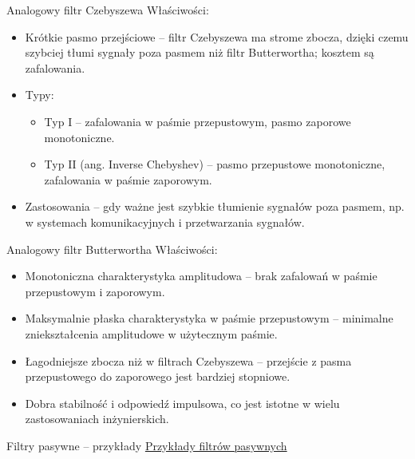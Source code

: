 \begin{frame}{Analogowy filtr Czebyszewa}
	Właściwości:
	\begin{itemize}
		\item[\bt] Krótkie pasmo przejściowe – filtr Czebyszewa ma strome zbocza, dzięki czemu szybciej tłumi sygnały poza pasmem niż filtr Butterwortha; kosztem są zafalowania.
		\item[\bt] Typy:
		      \begin{itemize}
			      \item[\bt] Typ I – zafalowania w paśmie przepustowym, pasmo zaporowe monotoniczne.
			      \item[\bt] Typ II (ang. Inverse Chebyshev) – pasmo przepustowe monotoniczne, zafalowania w paśmie zaporowym.
		      \end{itemize}
		\item[\bt] Zastosowania – gdy ważne jest szybkie tłumienie sygnałów poza pasmem, np. w systemach komunikacyjnych i przetwarzania sygnałów.
	\end{itemize}
\end{frame}

\begin{frame}{Analogowy filtr Butterwortha}
	Właściwości:
	\begin{itemize}
		\item[\bt] Monotoniczna charakterystyka amplitudowa – brak zafalowań w paśmie przepustowym i zaporowym.
		\item[\bt] Maksymalnie płaska charakterystyka w paśmie przepustowym – minimalne zniekształcenia amplitudowe w użytecznym paśmie.
		\item[\bt] Łagodniejsze zbocza niż w filtrach Czebyszewa – przejście z pasma przepustowego do zaporowego jest bardziej stopniowe.
		\item[\bt] Dobra stabilność i odpowiedź impulsowa, co jest istotne w wielu zastosowaniach inżynierskich.
	\end{itemize}
\end{frame}

\begin{frame}{Filtry pasywne – przykłady}
	\href{https://www.falstad.com/afilter/circuitjs.html?startCircuit=filt-hipass.txt}{Przykłady filtrów pasywnych}
\end{frame}

